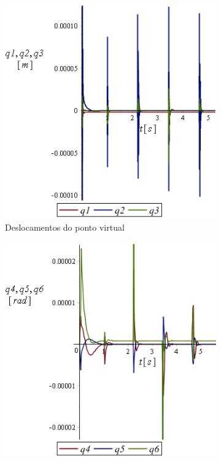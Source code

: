 \begin{figure}[h]
    \centering
    \begin{subfigure}[b]{0.48\textwidth}
        \includegraphics[width=\textwidth]{figs/t1_q123_base_testes}
        \caption{Deslocamentos do ponto virtual}
        \label{fig::t1_q123_base_testes}
    \end{subfigure}
    \quad %
    \begin{subfigure}[b]{0.48\textwidth}
        \includegraphics[width=\textwidth]{figs/t1_q456_base_testes}

\end{subfigure}
\end{figure}
